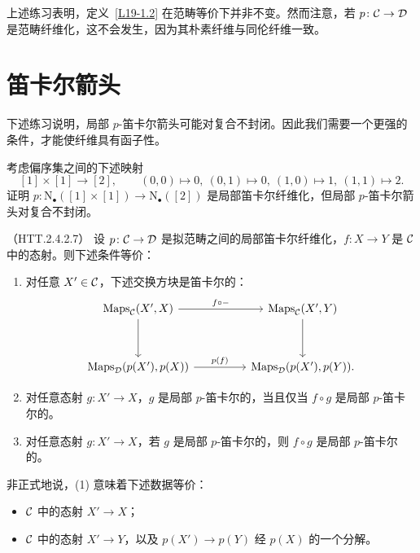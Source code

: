 \begin{warning}\label{L19-1.10}
上述练习表明，定义~\ref{L19-1.2} 在范畴等价下并非不变。然而注意，若 $p\colon\mathcal{C}\to\mathcal{D}$ 是范畴纤维化，这不会发生，因为其朴素纤维与同伦纤维一致。
\end{warning}

\section{笛卡尔箭头}

\nitem\label{L19-2.1} 下述练习说明，局部 $p$-笛卡尔箭头可能对复合不封闭。因此我们需要一个更强的条件，才能使纤维具有函子性。

\begin{example}\label{L19-2.2}
考虑偏序集之间的下述映射
\[
[1]\times[1]\to[2],\qquad (0,0)\mapsto 0,\ (0,1)\mapsto 0,\ (1,0)\mapsto 1,\ (1,1)\mapsto 2.
\]
证明 $p\colon\mathrm{N}_{\bullet}([1]\times[1])\to\mathrm{N}_{\bullet}([2])$ 是局部笛卡尔纤维化，但局部 $p$-笛卡尔箭头对复合不封闭。
\end{example}

\begin{proposition}\label{L19-2.3}（HTT.2.4.2.7）
设 $p\colon\mathcal{C}\to\mathcal{D}$ 是拟范畴之间的局部笛卡尔纤维化，$f\colon X\to Y$ 是 $\mathcal{C}$ 中的态射。则下述条件等价：
\begin{enumerate}[label=(\arabic*),leftmargin=2.4em,itemsep=0.1em]
\item 对任意 $X'\in\mathcal{C}$，下述交换方块是笛卡尔的：
\begin{equation}\label{L19-2.1eq}
\begin{tikzcd}[column sep=4.6em,row sep=3.4em]
\operatorname{Maps}_{\cC}(X',X) \arrow[r,"f\circ-"] \arrow[d] &
\operatorname{Maps}_{\cC}(X',Y) \arrow[d]\\
\operatorname{Maps}_{\cD}(p(X'),p(X)) \arrow[r,"p(f)"] &
\operatorname{Maps}_{\cD}(p(X'),p(Y)).
\end{tikzcd}
\end{equation}
\item 对任意态射 $g\colon X'\to X$，$g$ 是局部 $p$-笛卡尔的，当且仅当 $f\circ g$ 是局部 $p$-笛卡尔的。
\item 对任意态射 $g\colon X'\to X$，若 $g$ 是局部 $p$-笛卡尔的，则 $f\circ g$ 是局部 $p$-笛卡尔的。
\end{enumerate}
\end{proposition}

\begin{remark}\label{L19-2.4}
非正式地说，(1) 意味着下述数据等价：
\begin{itemize}[leftmargin=2.2em,itemsep=0.1em]
\item $\mathcal{C}$ 中的态射 $X'\to X$；
\item $\mathcal{C}$ 中的态射 $X'\to Y$，以及 $p(X')\to p(Y)$ 经 $p(X)$ 的一个分解。
\end{itemize}
\end{remark}

